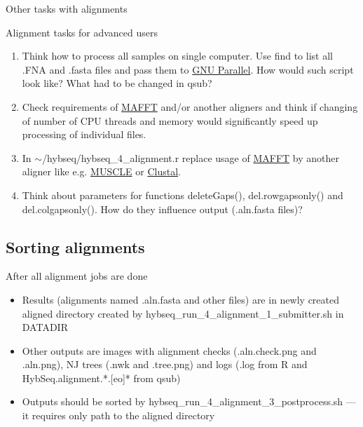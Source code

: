 \documentclass[compress, ucs, xelatex, 11pt, xcolor=x11names, aspectratio=169,
	hyperref={
		bookmarks=true,
		unicode=true,
		colorlinks=true,
		pdftitle={HybSeq course},
		plainpages=false,
		pdfauthor={Vojtech Zeisek},
		pdfsubject={Practical processing of HybSeq target enrichment sequencing data on computing grids like MetaCentrum},
		pdfcreator={XeLaTeX},
		pdfkeywords={BASH, command line, GNU, HybSeq, Linux, MetaCentrum, sequencing shell, target enrichment},
		linkcolor=Cyan2, %
		anchorcolor=Firebrick2, %
		citecolor=Firebrick2, %
		filecolor=Firebrick2, %
		menucolor=Firebrick2, %
		urlcolor=Chartreuse2, %
		pdftex},
	url={hyphens, lowtilde} %
	]{beamer}
\renewcommand{\texttt}[1]{\colorbox{Snow4}{{\ttfamily #1}}}
\begin{document}
\begin{frame}{Other tasks with alignments}
	\begin{exampleblock}{Alignment tasks for advanced users}
		\begin{enumerate}
			\item Think how to process all samples on single computer. Use \texttt{find} to list all \texttt{*.FNA} and \texttt{*.fasta} files and pass them to \href{https://www.gnu.org/software/parallel/}{GNU Parallel}. How would such script look like? What had to be changed in \texttt{qsub}?
			\item Check requirements of \href{https://mafft.cbrc.jp/alignment/software/}{MAFFT} and/or another aligners and think if changing of number of CPU threads and memory would significantly speed up processing of individual files.
			\item In \texttt{$\sim$/hybseq/hybseq\_4\_alignment.r} replace usage of \href{https://mafft.cbrc.jp/alignment/software/}{MAFFT} by another aligner like e.g. \href{https://www.drive5.com/muscle/}{MUSCLE} or \href{http://clustal.org/}{Clustal}.
			\item Think about parameters for functions \texttt{deleteGaps()}, \texttt{del.rowgapsonly()} and \texttt{del.colgapsonly()}. How do they influence output (\texttt{*.aln.fasta} files)?
		\end{enumerate}
	\end{exampleblock}
\end{frame}

\subsection{Sorting alignments}

\begin{frame}{After all alignment jobs are done}
	\begin{itemize}
		\item Results (alignments named \texttt{*.aln.fasta} and other files) are in newly created \texttt{aligned} directory created by \texttt{hybseq\_run\_4\_alignment\_1\_submitter.sh} in \texttt{DATADIR}
		\item Other outputs are images with alignment checks (\texttt{*.aln.check.png} and \texttt{*.aln.png}), NJ trees (\texttt{*.nwk} and \texttt{*.tree.png}) and logs (\texttt{*.log} from \texttt{R} and \texttt{HybSeq.alignment.*.[eo]*} from \texttt{qsub})
		\item Outputs should be sorted by \texttt{hybseq\_run\_4\_alignment\_3\_postprocess.sh} --- it requires only path to the \texttt{aligned} directory
	\end{itemize}
\end{frame}
\end{document}
